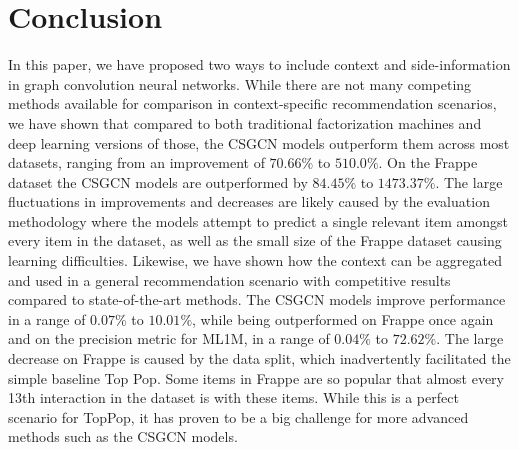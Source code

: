 \section{Conclusion}\label{sec:conclusion}
In this paper, we have proposed two ways to include context and side-information in graph convolution neural networks.
While there are not many competing methods available for comparison in context-specific recommendation scenarios, we have shown that compared to both traditional factorization machines and deep learning versions of those, the CSGCN models outperform them across most datasets, ranging from an improvement of $70.66\%$ to $510.0\%$.
On the Frappe dataset the CSGCN models are outperformed by $84.45\%$ to $1473.37\%$.
The large fluctuations in improvements and decreases are likely caused by the evaluation methodology where the models attempt to predict a single relevant item amongst every item in the dataset, as well as the small size of the Frappe dataset causing learning difficulties.
Likewise, we have shown how the context can be aggregated and used in a general recommendation scenario with competitive results compared to state-of-the-art methods.
The CSGCN models improve performance in a range of $0.07\%$ to $10.01\%$, while being outperformed on Frappe once again and on the precision metric for ML1M, in a range of $0.04\%$ to $72.62\%$.
The large decrease on Frappe is caused by the data split, which inadvertently facilitated the simple baseline Top Pop.
Some items in Frappe are so popular that almost every 13th interaction in the dataset is with these items.
While this is a perfect scenario for TopPop, it has proven to be a big challenge for more advanced methods such as the CSGCN models.


